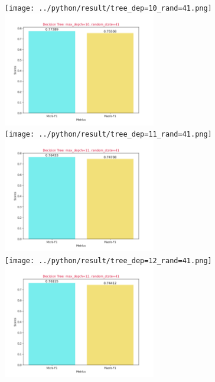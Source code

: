 \documentclass{article}
\begin{document}
\texttt{[image: ../python/result/tree\_dep=10\_rand=41.png]}
\includegraphics[width=0.5\textwidth]{../python/result/score_dep=10_rand=41.png}\\
\texttt{[image: ../python/result/tree\_dep=11\_rand=41.png]}
\includegraphics[width=0.5\textwidth]{../python/result/score_dep=11_rand=41.png}\\
\texttt{[image: ../python/result/tree\_dep=12\_rand=41.png]}
\includegraphics[width=0.5\textwidth]{../python/result/score_dep=12_rand=41.png}\\
\end{document}
